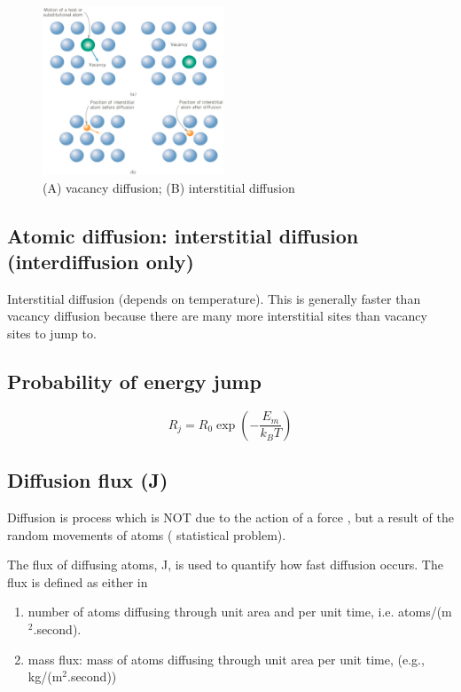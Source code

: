\begin{figure}[hbtp]
  \centerline{\includegraphics[height=5cm,
    angle=0]{./images/motion.eps}}
\caption{(A) vacancy diffusion; (B) interstitial diffusion}
\label{fig:motion}
\end{figure}

\subsection{Atomic diffusion: interstitial diffusion (interdiffusion only)}

Interstitial diffusion (depends on temperature).  This is generally faster than
vacancy diffusion because there are many more interstitial sites than vacancy
sites to jump to.

\subsection{Probability of energy jump}


\begin{equation}
R_j = R_0 \exp \left( - \frac{E_m}{k_BT} \right)
\end{equation}



\subsection{Diffusion flux (J)}

Diffusion is process which is NOT due to the action of a force , but a result of
the random movements of atoms ( statistical problem).

The flux of diffusing atoms, J, is used to quantify how fast diffusion occurs. 
The flux is defined as either in 
\begin{enumerate}
  \item  number of atoms diffusing through unit area and
per unit time, i.e. atoms/(m$^2$.second).

  \item mass flux: mass of atoms diffusing through
unit area per unit time, (e.g., kg/(m$^2$.second))
\end{enumerate}

